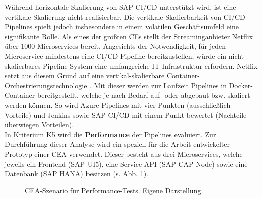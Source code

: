 Während horizontale Skalierung von SAP CI/CD unterstützt wird, ist eine vertikale Skalierung nicht realisierbar. Die vertikale Skalierbarkeit von CI/CD-Pipelines spielt jedoch insbesondere in einem volatilen Geschäftsumfeld eine signifikante Rolle. Als eines der größten CEs stellt der Streaminganbieter Netflix über 1000 Microservices bereit. Angesichts der Notwendigkeit, für jeden Microservice mindestens eine CI/CD-Pipeline bereitzustellen, würde ein nicht skalierbares Pipeline-System eine umfangreiche IT-Infrastruktur erfordern. Netflix setzt aus diesem Grund auf eine vertikal-skalierbare Container-Orchestrierungstechnologie \cite{Blog.20170419}\cite{CloudZero.20230419}. Mit dieser werden zur Laufzeit Pipelines in Docker-Container bereitgestellt, welche je nach Bedarf auf- oder abgebaut bzw. skaliert werden können. So wird Azure Pipelines mit vier Punkten (ausschließlich Vorteile) und Jenkins sowie SAP CI/CD mit einem Punkt bewertet (Nachteile überwiegen Vorteilen).\\ In Kriterium K5 wird die \textbf{Performance} der Pipelines evaluiert. Zur Durchführung dieser Analyse wird ein speziell für die Arbeit entwickelter Prototyp einer CEA verwendet. Dieser besteht aus drei Microservices, welche jeweils ein Frontend (SAP UI5), eine Service-API (SAP CAP Node) sowie eine Datenbank (SAP HANA) besitzen (s. Abb. \ref{fig:Szenario}).
 \begin{center}
	\begin{figure}[H]
		\centering
		\caption[CEA-Szenario für Performance-Tests]{CEA-Szenario für Performance-Tests. Eigene Darstellung.}
		\label{fig:Szenario}
	\end{figure}
\end{center}
\vspace*{-15mm}
